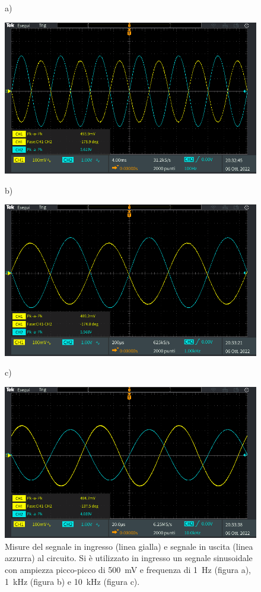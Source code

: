\begin{figure}[h!]
	\centering
	a)
	
	\includegraphics[width=0.8\linewidth]{./ImageFiles/Laboratorio 1/TEK00001}	
\end{figure}
\begin{figure}[h!]
	\centering
	b)
	
	\includegraphics[width=0.8\linewidth]{./ImageFiles/Laboratorio 1/TEK00002}
\end{figure}
\begin{figure}[h!]
	\centering
	c)
	
	\includegraphics[width=0.8\linewidth]{./ImageFiles/Laboratorio 1/TEK00004}
	\caption{Misure del segnale in ingresso (linea gialla) e segnale in uscita (linea azzurra) al circuito. Si è utilizzato in ingresso un segnale sinusoidale con ampiezza picco-picco di \SI{500}{\milli\volt} e frequenza di \SI{1}{\hertz} (figura a), \SI{1}{\kilo\hertz} (figura b) e \SI{10}{\kilo\hertz} (figura c).}
	\label{fig:misure_oscilloscopio_1}
\end{figure}

